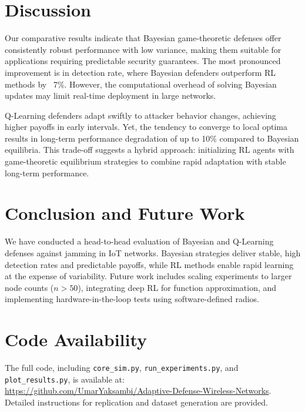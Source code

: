 \documentclass[conference]{IEEEtran}
\begin{document}
\section{Discussion}
Our comparative results indicate that Bayesian game-theoretic defenses offer consistently robust performance with low variance, making them suitable for applications requiring predictable security guarantees. The most pronounced improvement is in detection rate, where Bayesian defenders outperform RL methods by ~7\%. However, the computational overhead of solving Bayesian updates may limit real-time deployment in large networks.

Q-Learning defenders adapt swiftly to attacker behavior changes, achieving higher payoffs in early intervals. Yet, the tendency to converge to local optima results in long-term performance degradation of up to 10\% compared to Bayesian equilibria. This trade-off suggests a hybrid approach: initializing RL agents with game-theoretic equilibrium strategies to combine rapid adaptation with stable long-term performance.

\section{Conclusion and Future Work}
We have conducted a head-to-head evaluation of Bayesian and Q-Learning defenses against jamming in IoT networks. Bayesian strategies deliver stable, high detection rates and predictable payoffs, while RL methods enable rapid learning at the expense of variability. Future work includes scaling experiments to larger node counts ($n>50$), integrating deep RL for function approximation, and implementing hardware-in-the-loop tests using software-defined radios.

\section*{Code Availability}
The full code, including \texttt{core\_sim.py}, \texttt{run\_experiments.py}, and \texttt{plot\_results.py}, is available at:\\
\url{https://github.com/UmarYaksambi/Adaptive-Defense-Wireless-Networks}. Detailed instructions for replication and dataset generation are provided.

\appendix
\end{document}
